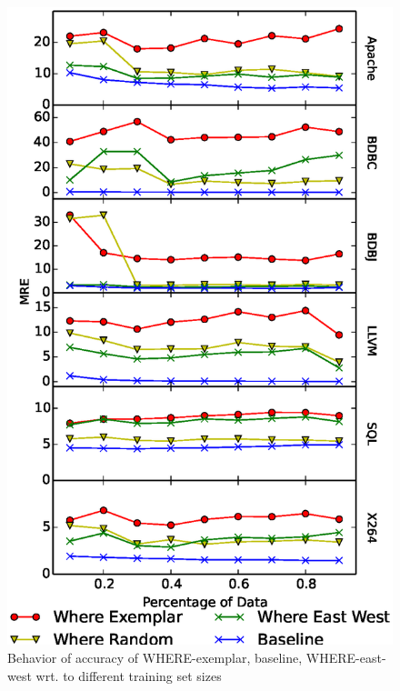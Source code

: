 \documentclass{sig-alternative}
\begin{document}
\begin{figure}[!t]
\includegraphics[width=0.9\linewidth]{Figures/SamplingAccuracy.eps}
\caption{Behavior of accuracy of WHERE-exemplar, baseline, WHERE-east-west wrt. to different training set sizes }\label{fig:sampling_accuracy}
\end{figure}








\end{document}
